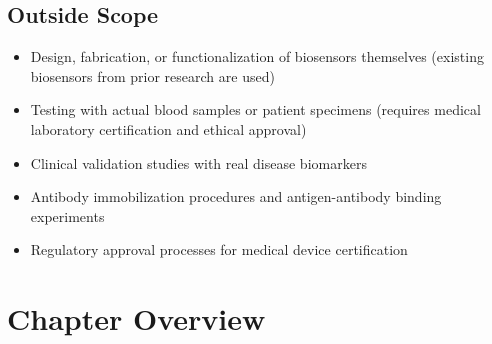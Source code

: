 \subsection{Outside Scope}
\begin{itemize}
    \item Design, fabrication, or functionalization of biosensors themselves (existing biosensors from prior research are used)
    \item Testing with actual blood samples or patient specimens (requires medical laboratory certification and ethical approval)
    \item Clinical validation studies with real disease biomarkers
    \item Antibody immobilization procedures and antigen-antibody binding experiments
    \item Regulatory approval processes for medical device certification
\end{itemize}

\section{Chapter Overview}

